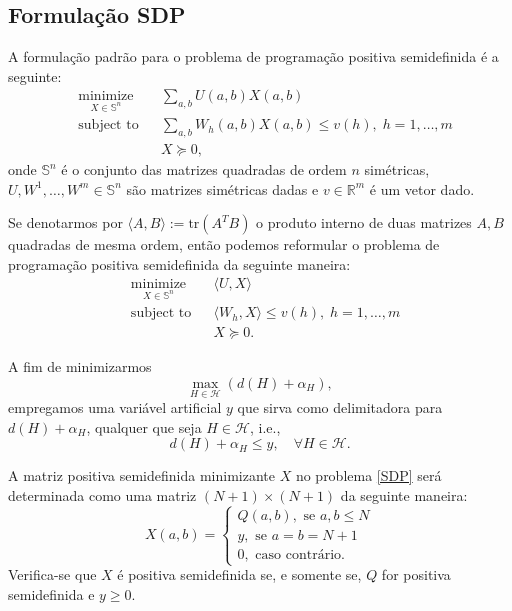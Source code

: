 \documentclass{amsart}
\theoremstyle{theorem}
\theoremstyle{definition}
\theoremstyle{remark}
\numberwithin{equation}{section}
\newcommand{\mnn}[1]{\marginpar[\begin{flushright} \footnotesize{#1}\end{flushright}]{\begin{flushleft}\footnotesize{#1}\end{flushleft}}}
\newcommand{\tr}[1]{\mathrm{tr}(#1)}
\begin{document}
\subsection{Formula\c{c}\~{a}o SDP}
A formula\c{c}\~{a}o padr\~{a}o para o problema de programa\c{c}\~{a}o positiva semidefinida \'{e} a seguinte:
\begin{equation}\label{SDP}
\begin{aligned}
& \underset{X \in \mathbb{S}^n}{\text{minimize}} & & \displaystyle{ \sum_{a,b} U(a,b)X(a,b)} \\
& \text{subject to} & & \displaystyle{\sum_{a,b} W_{h}(a,b) X(a,b)} \leq v(h),\;  h = 1 ,\ldots, m \\
&&& X \succeq 0,
\end{aligned}
\end{equation}
onde $\mathbb{S}^{n}$ \'{e} o conjunto das matrizes quadradas de ordem $n$ sim\'{e}tricas, $U,W^1,\ldots,W^m \in\mathbb{S}^{n}$ s\~{a}o matrizes sim\'{e}tricas dadas e $v\in\mathbb{R}^m$ \'{e} um vetor dado.

Se denotarmos por $\langle A,B \rangle := \tr{A^{T}B}$\mnn{$\langle A,B \rangle$} o produto interno de duas matrizes $A,B$ quadradas de mesma ordem, ent\~{a}o podemos reformular o problema de programa\c{c}\~{a}o positiva semidefinida da seguinte maneira:
\begin{equation}\label{SDP}
\begin{aligned}
& \underset{X \in \mathbb{S}^n}{\text{minimize}} & & \displaystyle{\langle U,X \rangle} \\
& \text{subject to} & & \displaystyle{\langle W_{h},X \rangle} \leq v(h),\;  h = 1 ,\ldots, m \\
&&& X \succeq 0.
\end{aligned}
\end{equation}

A fim de minimizarmos
$$\max_{H\in\mathcal{H}}{(d(H)+\alpha_H)},$$
empregamos uma vari\'{a}vel artificial $y$ que sirva como delimitadora para $d(H)+\alpha_H$, qualquer que seja $H\in\mathcal{H}$, i.e.,
\begin{equation}\label{dHy}
  d(H) + \alpha_H \leq y, \quad \forall H\in\mathcal{H}.
\end{equation}

A matriz positiva semidefinida minimizante $X$ no problema \ref{SDP} ser\'{a} determinada como uma matriz $(N+1) \times (N+1)$ da seguinte maneira:
\begin{equation*}
  X(a,b) =
\left\{\begin{array}{l}
    Q(a,b), \text{ se } a,b \leq N \\
    y, \text{ se } a = b = N+1 \\
    0, \text{ caso contr\'{a}rio}.
\end{array}\right.
\end{equation*}
Verifica-se que $X$ \'{e} positiva semidefinida se, e somente se, $Q$ for positiva semidefinida e $y\geq 0$.
\end{document}
